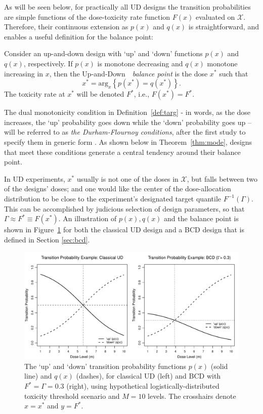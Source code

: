 As will be seen below, for practically all UD designs the transition probabilities are simple functions of the dose-toxicity rate function $F(x)$ evaluated on $\mathcal{X}$. Therefore, their continuous extension as $p(x)$ and $q(x)$ is straightforward, and enables a useful definition for the balance point:
%
\begin{defn}\label{def:targ}  Consider an up-and-down design with `up' and `down' functions $p(x)$ and $q(x)$, respectively. If $p(x)$ is monotone decreasing and $q(x)$ monotone increasing in $x$,
then the Up-and-Down\ \  \emph{balance point} is the dose $x^*$ such that
\begin{equation}\label{eq:deftarget}
x^*=\mathrm{arg}_x \left\{p(x^*)=q(x^*)\right\}.
\end{equation}
The toxicity rate at $x^*$ will be denoted $F^*$, i.e., $F(x^*)=F^*$.
\end{defn}
%
The dual monotonicity condition in Definition~\ref{def:targ} - in words, as the dose increases, the `up' probability goes down while the `down' probability goes up --  will be referred to as \emph{the Durham-Flournoy conditions}, after the first study to specify them in generic form \citep{Durh:Flou:rand:1994,Durh:Flou:up-a:1995}. As shown below in Theorem~\ref{thm:mode}, designs that meet these conditions generate a central tendency around their balance point.

In UD experiments, $x^*$ usually is not one of the doses in $\mathcal{X}$, but falls between two of the designs' doses; and one would like the center of the dose-allocation distribution to be close to the experiment's designated target quantile $F^{-1}(\Gamma)$. This can be accomplished by judicious selection of design parameters, so that  $\Gamma\approx F^*\equiv F(x^*)$.  An illustration of $p(x),q(x)$ and the balance point is shown in Figure~\ref{fig:pq} for both the classical UD design and a BCD design that is defined in Section \ref{sec:bcd}.
%
\begin{figure}
\begin{center}
\includegraphics[scale=0.55]{pqfig}
\caption{The `up' and `down' transition probability functions $p(x)$ (solid line) and $q(x)$ (dashes), for classical UD (left) and BCD with $F^*=\Gamma=0.3$ (right), using hypothetical logistically-distributed toxicity threshold scenario and $M=10$ levels. The crosshairs denote $x=x^*$ and $y=F^*$.}\label{fig:pq}
\end{center}
\end{figure}

